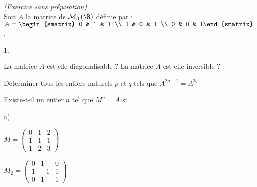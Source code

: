 \documentclass[11pt]{article}%
\begin{document}
\addtocounter{exercice}{-1}
\begin{exercice}{\it (Exercice sans préparation)}~\\
  Soit $A$ la matrice de $\mathcal{M}_{3}\left( \R\right) $ définie
  par : $A=%
  \begin{smatrix}
    0 & 1 & 1 \\
    1 & 0 & 1 \\
    0 & 0 & 1%
  \end{smatrix}%
  $.
  \begin{noliste}{1.}
  \item La matrice $A$ est-elle diagonalisable ? La matrice $A$
    est-elle inversible ?
  \item Déterminer tous les entiers naturels $p$ et $q$ tels que $%
    A^{2p+1}=A^{2q}$
  \item Existe-t-il un entier $n$ tel que $M^{n}=A$ si
    \begin{noliste}{a)}
    \item $M=\left(
        \begin{array}{ccc}
          0 & 1 & 2 \\
          1 & 1 & 1 \\
          1 & 2 & 3%
        \end{array}%
      \right) $
    \item $M_{2}=\left(
        \begin{array}{ccc}
          0 & 1 & 0 \\
          1 & -1 & 1 \\
          0 & 1 & 1%
        \end{array}%
      \right) $
    \end{noliste}    
  \end{noliste}
\end{exercice}


\newpage
\end{document}
